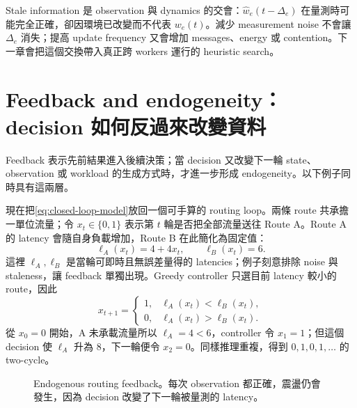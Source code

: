 \documentclass[11pt,a4paper,oneside,openany]{book}
\begin{document}
Stale information 是 observation 與 dynamics 的交會：$\widehat w_e(t-\Delta_e)$ 在量測時可能完全正確，卻因環境已改變而不代表 $w_e(t)$。減少 measurement noise 不會讓 $\Delta_e$ 消失；提高 update frequency 又會增加 messages、energy 或 contention。下一章會把這個交換帶入真正跨 workers 運行的 heuristic search。

\section{Feedback and endogeneity：decision 如何反過來改變資料}

Feedback 表示先前結果進入後續決策；當 decision 又改變下一輪 state、observation 或 workload 的生成方式時，才進一步形成 endogeneity。以下例子同時具有這兩層。

現在把\cref{eq:closed-loop-model}放回一個可手算的 routing loop。兩條 route 共承擔一單位流量；令 $x_t\in\{0,1\}$ 表示第 $t$ 輪是否把全部流量送往 Route A。Route A 的 latency 會隨自身負載增加，Route B 在此簡化為固定值：
\begin{equation}
 \label{eq:endogenous-routing-cost}
 \ell_A(x_t)=4+4x_t,
 \qquad
 \ell_B(x_t)=6.
\end{equation}
這裡 $\ell_A,\ell_B$ 是當輪可即時且無誤差量得的 latencies；例子刻意排除 noise 與 staleness，讓 feedback 單獨出現。Greedy controller 只選目前 latency 較小的 route，因此
\begin{equation}
 \label{eq:endogenous-routing-policy}
 x_{t+1}=
 \begin{cases}
 1,&\ell_A(x_t)<\ell_B(x_t),\\
 0,&\ell_A(x_t)>\ell_B(x_t).
 \end{cases}
\end{equation}
從 $x_0=0$ 開始，A 未承載流量所以 $\ell_A=4<6$，controller 令 $x_1=1$；但這個 decision 使 $\ell_A$ 升為 8，下一輪便令 $x_2=0$。同樣推理重複，得到 $0,1,0,1,\ldots$ 的 two-cycle。

\begin{figure}[htbp]
\centering
{}
\caption{Endogenous routing feedback。每次 observation 都正確，震盪仍會發生，因為 decision 改變了下一輪被量測的 latency。}
\label{fig:endogenous-routing-loop}
\end{figure}
\end{document}
